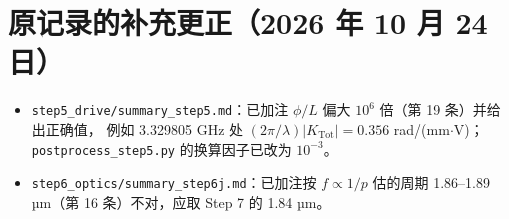 \documentclass[10pt,a4paper]{article}
\begin{document}
\section{原记录的补充更正（2026 年 10 月 24 日）}
\begin{itemize}
\item \texttt{step5\_drive/summary\_step5.md}：已加注 $\phi/L$ 偏大 $10^6$ 倍（第 19 条）并给出正确值，
例如 3.329805 GHz 处 $(2\pi/\lambda)|K_\mathrm{Tot}| = 0.356$ rad/(mm$\cdot$V)；\texttt{postprocess\_step5.py} 的换算因子已改为 $10^{-3}$。
\item \texttt{step6\_optics/summary\_step6j.md}：已加注按 $f\propto1/p$ 估的周期 1.86–1.89 µm（第 16 条）不对，应取 Step 7 的 1.84 µm。
\end{itemize}
\end{document}
